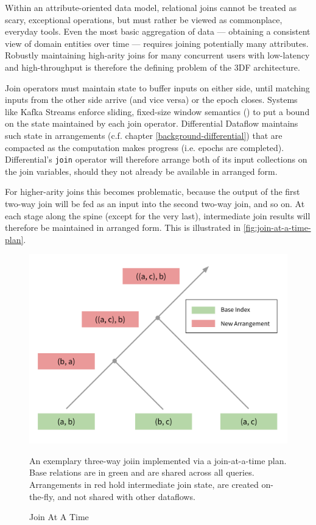\documentclass[../catalog.tex]{subfiles}
\begin{document}
Within an attribute-oriented data model, relational joins cannot be
treated as scary, exceptional operations, but must rather be viewed as
commonplace, everyday tools. Even the most basic aggregation of data —
obtaining a consistent view of domain entities over time — requires
joining potentially many attributes. Robustly maintaining high-arity
joins for many concurrent users with low-latency and high-throughput
is therefore the defining problem of the 3DF architecture.

Join operators must maintain state to buffer inputs on either side,
until matching inputs from the other side arrive (and vice versa) or
the epoch closes. Systems like Kafka Streams enforce sliding,
fixed-size window semantics (\cite{kafkadocs}) to put a bound on the
state maintained by each join operator. Differential Dataflow
maintains such state in arrangements (c.f. chapter
\ref{background-differential}) that are compacted as the computation
makes progress (i.e. epochs are completed). Differential's
\texttt{join} operator will therefore arrange both of its input
collections on the join variables, should they not already be
available in arranged form.

For higher-arity joins this becomes problematic, because the output of
the first two-way join will be fed as an input into the second two-way
join, and so on. At each stage along the spine (except for the very
last), intermediate join results will therefore be maintained in
arranged form. This is illustrated in
\autoref{fig:join-at-a-time-plan}.

\begin{figure}[h!]
  \includegraphics[width=1.0\linewidth]{diagrams/join-at-a-time}
  \caption{Join At A Time}
  \label{fig:join-at-a-time-plan}

  \medskip
  \small

  An exemplary three-way joiin implemented via a join-at-a-time
  plan. Base relations are in green and are shared across all
  queries. Arrangements in red hold intermediate join state, are
  created on-the-fly, and not shared with other dataflows.
\end{figure}
\end{document}
